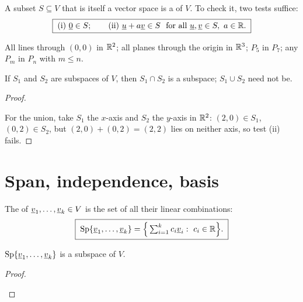 \begin{definition}[Subspace]
A subset $S\subseteq V$ that is itself a vector space is a  of $V$. To check it, two tests suffice:
\[
  \boxed{\;\text{(i) }\underline{0}\in S;\qquad\text{(ii) }\underline{u}+a\underline{v}\in S\ \text{ for all }\underline{u},\underline{v}\in S,\ a\in\mathbb{R}.\;}
\]
\end{definition}

\begin{example}[Subspaces]
All lines through $(0,0)$ in $\mathbb{R}^2$; all planes through the origin in $\mathbb{R}^3$; $P_5$ in $P_7$; any $P_m$ in $P_n$ with $m\le n$.
\end{example}

\begin{result}
If $S_1$ and $S_2$ are subspaces of $V$, then $S_1\cap S_2$ is a subspace; $S_1\cup S_2$ need not be.
\end{result}
\begin{proof}
\begin{deriv}
\end{deriv}
For the union, take $S_1$ the $x$-axis and $S_2$ the $y$-axis in $\mathbb{R}^2$: $(2,0)\in S_1$, $(0,2)\in S_2$, but $(2,0)+(0,2)=(2,2)$ lies on neither axis, so test (ii) fails.
\end{proof}

\section{Span, independence, basis}

\begin{definition}[Span]
The  of $\underline{v}_1,\dots,\underline{v}_k\in V$ is the set of all their linear combinations:
\[
  \boxed{\;\Sp\{\vect{v}_1,\dots,\vect{v}_k\}=\Big\{\textstyle\sum_{i=1}^kc_i\vect{v}_i:\ c_i\in\R\Big\}.\;}
\]
\end{definition}

\begin{result}
$\operatorname{Sp}\{\underline{v}_1,\dots,\underline{v}_k\}$ is a subspace of $V$.
\end{result}
\begin{proof}
\begin{deriv}
\end{deriv}
\end{proof}

